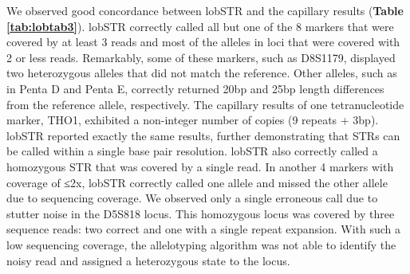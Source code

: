 We observed good concordance between lobSTR and the capillary results (\textbf{Table \ref{tab:lobtab3}}). lobSTR correctly called all but one of the 8 markers that were covered by at least 3 reads and most of the alleles in loci that were covered with 2 or less reads. Remarkably, some of these markers, such as D8S1179, displayed two heterozygous alleles that did not match the reference. Other alleles, such as in Penta D and Penta E, correctly returned 20bp and 25bp length differences from the reference allele, respectively. The capillary results of one tetranucleotide marker, THO1, exhibited a non-integer number of copies (9 repeats + 3bp). lobSTR reported exactly the same results, further demonstrating that STRs can be called within a single base pair resolution. lobSTR also correctly called a homozygous STR that was covered by a single read. In another 4 markers with coverage of ≤2x, lobSTR correctly called one allele and missed the other allele due to sequencing coverage. We observed only a single erroneous call due to stutter noise in the D5S818 locus. This homozygous locus was covered by three sequence reads: two correct and one with a single repeat expansion. With such a low sequencing coverage, the allelotyping algorithm was not able to identify the noisy read and assigned a heterozygous state to the locus. 

